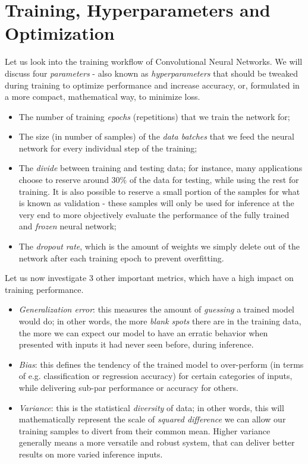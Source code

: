 \section{Training, Hyperparameters and Optimization}
Let us look into the training workflow of Convolutional Neural Networks. We will discuss four \textit{parameters} - also known as \textit{hyperparameters} that should be tweaked during training to optimize performance and increase accuracy, or, formulated in a more compact, mathematical way, to minimize loss.
\begin{itemize}
    \item The number of training \textit{epochs} (repetitions) that we train the network for;
    \item The size (in number of samples) of the \textit{data batches} that we feed the neural network for every individual step of the training;
    \item The \textit{divide} between training and testing data; for instance, many applications choose to reserve around 30\% of the data for testing, while using the rest for training. It is also possible to reserve a small portion of the samples for what is known as validation - these samples will only be used for inference at the very end to more objectively evaluate the performance of the fully trained and \textit{frozen} neural network;
    \item The \textit{dropout rate}, which is the amount of weights we simply delete out of the network after each training epoch to prevent overfitting.
\end{itemize}
Let us now investigate 3 other important metrics, which have a high impact on training performance.
\begin{itemize}
    \item \textit{Generalization error}: this measures the amount of \textit{guessing} a trained model would do; in other words, the more \textit{blank spots} there are in the training data, the more we can expect our model to have an erratic behavior when presented with inputs it had never seen before, during inference.
    \item \textit{Bias}: this defines the tendency of the trained model to over-perform (in terms of e.g. classification or regression accuracy) for certain categories of inputs, while delivering sub-par performance or accuracy for others.
    \item \textit{Variance}: this is the statistical \textit{diversity} of data; in other words, this will mathematically represent the scale of \textit{squared difference} we can allow our training samples to divert from their common mean. Higher variance generally means a more versatile and robust system, that can deliver better results on more varied inference inputs.
\end{itemize}

